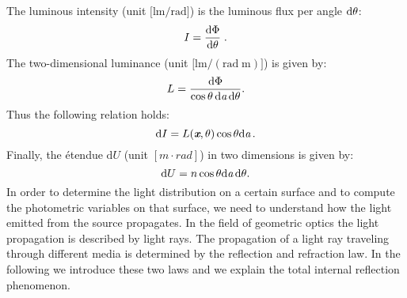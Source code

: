  The luminous intensity \big(unit $\big[\textrm{lm}/\textrm{rad}\big]$\big) is the luminous flux per angle $\textrm{d}\mbox{$\theta$}$:
 \begin{equation}
 I=\frac{\textrm{d}\Phi}{\textrm{d}\mbox{$\theta$}}\;.
 \end{equation}
 The two-dimensional luminance \big(unit $\big[\textrm{lm}/(\textrm{rad}\; \textrm{m})\big]$\big) is given by:
 \begin{equation}
 L= \frac{\textrm {d}\Phi}{\cos\mbox{$\theta$}\,\textrm{d}\textit{a} \,\textrm{d}\mbox{$\theta$}}.
 \end{equation}
 Thus the following relation holds:
 \begin{equation}
 \textrm{d}I = L(\textit{\textbf{x}}, \mbox{$\theta$})\cos\mbox{$\theta$}\textrm{d}\textit{a}\,.
 \end{equation}
 Finally, the \'{e}tendue $\textrm{d}U $ (unit $[m\cdot rad]$) in two dimensions is given by:
\begin{equation}\label{etendue2d}
\textrm{d}U = n\cos\mbox{$\theta$}\textrm{d}\textit{a}\,\textrm{d}\mbox{$\theta$}.
\end{equation}
In order to determine the light distribution on a certain surface and to compute the photometric variables on that surface, we need to understand how the light emitted from the source propagates. In the field of geometric optics the light propagation is described by light rays.
The propagation of a light ray traveling through  different media is determined by the reflection and refraction law.
In the following we introduce these two laws and we explain the total internal reflection phenomenon.
